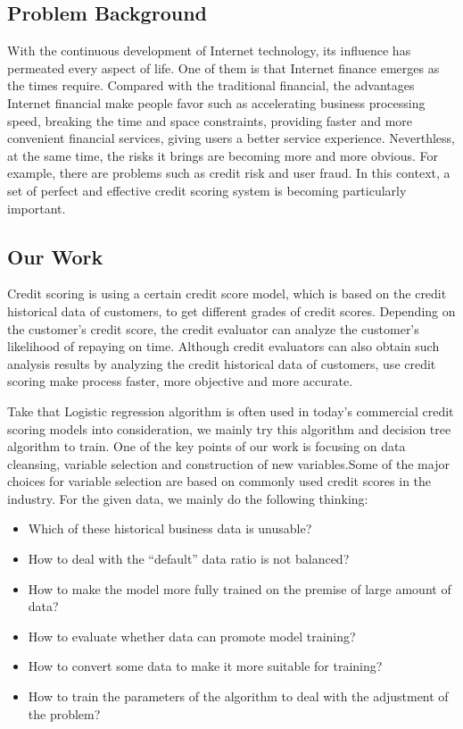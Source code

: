 \documentclass{mcmthesis}
\begin{document}
\subsection{Problem Background}

With the continuous development of Internet technology, its influence has permeated every aspect of life. One of them is that Internet finance emerges as the times require. Compared with the traditional financial, the advantages Internet financial make people favor such as accelerating business processing speed, breaking the time and space constraints, providing faster and more convenient financial services, giving users a better service experience. Neverthless, at the same time, the risks it brings are becoming more and more obvious. For example, there are problems such as credit risk and user fraud. In this context, a set of perfect and effective credit scoring system is becoming particularly important.
\subsection{Our Work}
Credit scoring is using a certain credit score model, which is based on the credit historical data of customers, to get different grades of credit scores. Depending on the customer's credit score, the credit evaluator can analyze the customer's likelihood of repaying on time. Although credit evaluators can also obtain such analysis results by analyzing the credit historical data of customers, use credit scoring make process faster, more objective and more accurate.

Take that Logistic regression algorithm is often used in today's commercial credit scoring models into consideration, we mainly try this algorithm and decision tree algorithm to train. One of the key points of our work is focusing on data cleansing, variable selection and construction of new variables.Some of the major choices for variable selection are based on commonly used credit scores in the industry. For the given data, we mainly do the following thinking:
\begin{itemize}
\item Which of these historical business data is unusable?
\item How to deal with the ``default'' data ratio is not balanced?
\item How to make the model more fully trained on the premise of large amount of data?
\item How to evaluate whether data can promote model training?
\item How to convert some data to make it more suitable for training?
\item How to train the parameters of the algorithm to deal with the adjustment of the problem?
\end{itemize}
\end{document}
